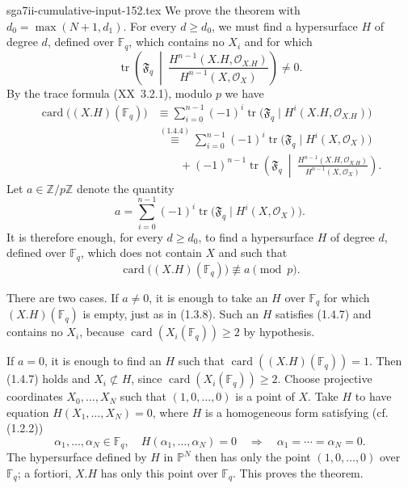 \begin{filecontents*}{sga7ii-cumulative-input-152.tex}
We prove the theorem with $d_0=\max(N+1,d_1)$.  For every $d\geq d_0$,
we must find a hypersurface $H$ of degree $d$, defined over $\mathbb F_q$,
which contains no $X_i$ and for which
\begin{equation}\tag{1.4.5}
\operatorname{tr}\!\left(\mathfrak F_q\ \middle|\
\frac{H^{n-1}(X.H,\mathcal O_{X.H})}
     {H^{n-1}(X,\mathcal O_X)}\right)\ne0.
\end{equation}
By the trace formula (XX~3.2.1), modulo $p$ we have
\begin{equation}\tag{1.4.6}
\begin{aligned}
\operatorname{card}\bigl((X.H)(\mathbb F_q)\bigr)
&\equiv\sum_{i=0}^{n-1}(-1)^i
 \operatorname{tr}\bigl(\mathfrak F_q\mid
 H^i(X.H,\mathcal O_{X.H})\bigr)\\
&\stackrel{(1.4.4)}{\equiv}
 \sum_{i=0}^{n-1}(-1)^i
 \operatorname{tr}\bigl(\mathfrak F_q\mid H^i(X,\mathcal O_X)\bigr)\\
&\qquad+(-1)^{n-1}\operatorname{tr}\!\left(\mathfrak F_q\ \middle|\
 \frac{H^{n-1}(X.H,\mathcal O_{X.H})}
      {H^{n-1}(X,\mathcal O_X)}\right).
\end{aligned}
\end{equation}
Let $a\in\mathbb Z/p\mathbb Z$ denote the quantity
\[
a=\sum_{i=0}^{n-1}(-1)^i
\operatorname{tr}\bigl(\mathfrak F_q\mid H^i(X,\mathcal O_X)\bigr).
\]
It is therefore enough, for every $d\geq d_0$, to find a hypersurface $H$
of degree $d$, defined over $\mathbb F_q$, which does not contain $X$ and
such that
\begin{equation}\tag{1.4.7}
\operatorname{card}\bigl((X.H)(\mathbb F_q)\bigr)\not\equiv a\pmod p.
\end{equation}

There are two cases.  If $a\ne0$, it is enough to take an $H$ over
$\mathbb F_q$ for which $(X.H)(\mathbb F_q)$ is empty, just as in (1.3.8).
Such an $H$ satisfies (1.4.7) and contains no $X_i$, because
$\operatorname{card}(X_i(\mathbb F_q))\geq2$ by hypothesis.

If $a=0$, it is enough to find an $H$ such that
$\operatorname{card}((X.H)(\mathbb F_q))=1$.  Then (1.4.7) holds and
$X_i\not\subset H$, since $\operatorname{card}(X_i(\mathbb F_q))\geq2$.
Choose projective coordinates $X_0,\dots,X_N$ such that $(1,0,\dots,0)$ is
a point of $X$.  Take $H$ to have equation $H(X_1,\dots,X_N)=0$, where $H$
is a homogeneous form satisfying (cf. (1.2.2))
\begin{equation}\tag{1.4.8}
\alpha_1,\dots,\alpha_N\in\mathbb F_q,\quad
H(\alpha_1,\dots,\alpha_N)=0
\quad\Longrightarrow\quad
\alpha_1=\cdots=\alpha_N=0.
\end{equation}
The hypersurface defined by $H$ in $\mathbb P^N$ then has only the point
$(1,0,\dots,0)$ over $\mathbb F_q$; a fortiori, $X.H$ has only this point
over $\mathbb F_q$.  This proves the theorem.


\end{filecontents*}
